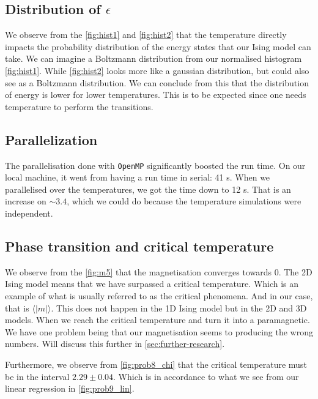 \documentclass[english,notitlepage,reprint,nofootinbib]{revtex4-2}  %
\begin{document}
	\subsection{Distribution of $\epsilon$}\label{subsec:dis epsilon}
	We observe from the \autoref{fig:hist1} and \autoref{fig:hist2} that the temperature directly impacts the probability distribution of the energy states that our Ising model can take.
	We can imagine a Boltzmann distribution from our normalised histogram \autoref{fig:hist1}.
	While \autoref{fig:hist2} looks more like a gaussian distribution, but could also see as a Boltzmann distribution.
	We can conclude from this that the distribution of energy is lower for lower temperatures.
	This is to be expected since one needs temperature to perform the transitions.

	\subsection{Parallelization}\label{subsec: dis parallelization}
	The parallelisation done with \lstinline{OpenMP} significantly boosted the run time.
	On our local machine, it went from having a run time in serial: 41 s.
	When we parallelised over the temperatures, we got the time down to 12 s.
	That is an increase on $\sim 3.4$, which we could do because the temperature simulations were independent.

	\subsection{Phase transition and critical temperature}\label{subsec: dis phase transition}
	We observe from the \autoref{fig:m5} that the magnetisation converges towards 0.
	The 2D Ising model means that we have surpassed a critical temperature.
	Which is an example of what is usually referred to as the critical phenomena.
	And in our case, that is $\langle |m| \rangle$.
	This does not happen in the 1D Ising model but in the 2D and 3D models.
	When we reach the critical temperature and turn it into a paramagnetic.
	We have one problem being that our magnetisation seems to producing the wrong numbers.
	Will discuss this further in \autoref{sec:further-research}.


	Furthermore, we observe from \autoref{fig:prob8_chi} that the critical temperature must be in the interval $2.29\pm 0.04$.
	Which is in accordance to what we see from our linear regression in \autoref{fig:prob9_lin}.
\end{document}

